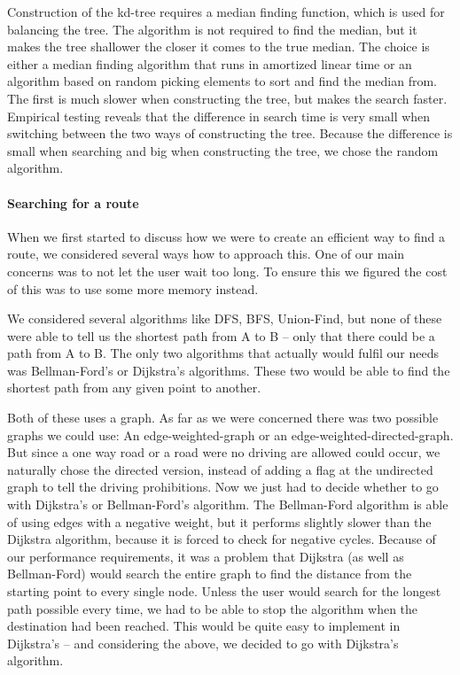 \documentclass[a4paper,10pt,titlepage]{article}
\begin{document}
Construction of the kd-tree requires a median finding function, which is used for balancing the tree. The algorithm is not required to find the median, but it makes the tree shallower the closer it comes to the true median. The choice is either a median finding algorithm that runs in amortized linear time or an algorithm based on random picking elements to sort and find the median from. The first is much slower when constructing the tree, but makes the search faster. Empirical testing reveals that the difference in search time is very small when switching between the two ways of constructing the tree. Because the difference is small when searching and big when constructing the tree, we chose the random algorithm.\\

\paragraph{Searching for a route}
When we first started to discuss how we were to create an efficient way to find a route, we considered several ways how to approach this. One of our main concerns was to not let the user wait too long. To ensure this we figured the cost of this was to use some more memory instead. 

We considered several algorithms like DFS, BFS, Union-Find, but none of these were able to tell us the shortest path from A to B – only that there could be a path from A to B. The only two algorithms that actually would fulfil our needs was Bellman-Ford’s or Dijkstra’s algorithms. These two would be able to find the shortest path from any given point to another. 

Both of these uses a graph. As far as we were concerned there was two possible graphs we could use: An edge-weighted-graph or an edge-weighted-directed-graph. But since a one way road or a road were no driving are allowed could occur, we naturally chose the directed version, instead of adding a flag at the undirected graph to tell the driving prohibitions. Now we just had to decide whether to go with Dijkstra’s or Bellman-Ford’s algorithm.
The Bellman-Ford algorithm is able of using edges with a negative weight, but it performs slightly slower than the  Dijkstra algorithm, because it is forced to check for negative cycles. Because of our performance requirements, it was a problem that Dijkstra (as well as Bellman-Ford) would search the entire graph to find the distance from the starting point to every single node. Unless the user would search for the longest path possible every time, we had to be able to stop the algorithm when the destination had been reached. This would be quite easy to implement in Dijkstra’s – and considering the above, we decided to go with Dijkstra’s algorithm.
\end{document}
